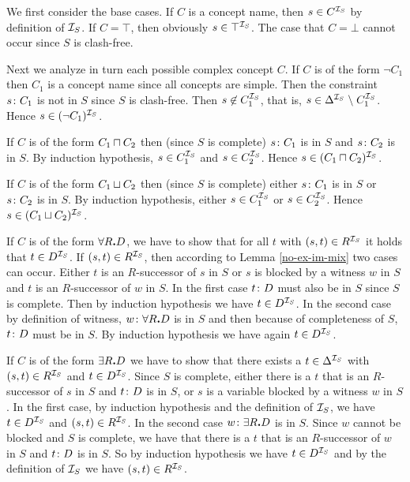 We first consider the base cases.
If $C$ is a concept name, then $s \in C^{{\cal I}_S}$ by definition
of ${{\cal I}_S}$. If $C=\top$, then obviously $s \in \top^{{\cal I}_S}$.
The case that $C=\bot$ cannot occur since $S$ is clash-free.

Next we analyze in turn each possible complex concept $C$.
%
If $C$ is of the form $\neg C_1$ then $C_1$ is a concept name since all
concepts are simple.
Then the constraint $s\colon C_1$ is not in $S$ since $S$ is clash-free.
Then $s \not\in C_1^{{\cal I}_S}$, that is, $s \in \Delta^{{\cal I}_S} \;\backslash\; C_1^{{\cal I}_S}$.
Hence $s \in (\neg C_1)^{{\cal I}_S}$.

If $C$ is of the form $C_1 \sqcap C_2$ then (since $S$ is complete) $s\colon C_1$
is in $S$ and $s\colon C_2$ is in $S$.
By induction hypothesis, $s \in C_1^{{\cal I}_S}$ and $s \in C^{{\cal I}_S}_2$.
Hence $s \in (C_1 \sqcap C_2)^{{\cal I}_S}$.

If $C$ is of the form $C_1 \sqcup C_2$ then (since $S$ is complete)
either $s\colon C_1$
is in $S$ or $s\colon C_2$ is in $S$.
By induction hypothesis, either $s \in C_1^{{\cal I}_S}$ or $s \in C^{{\cal I}_S}_2$.
Hence $s \in (C_1 \sqcup C_2)^{{\cal I}_S}$.

If $C$ is of the form $\forall R \mbox{\bf .} D$, we have to show that for all $t$ with 
$(s,t) \in R^{{\cal I}_S}$ it holds that $t \in D^{{\cal I}_S}$.
If $(s,t) \in R^{{\cal I}_S}$, then according to Lemma \ref{no-ex-im-mix}
two cases can occur.
Either $t$ is an $R$-successor of $s$ in $S$ or $s$ is blocked by a witness $w$
in $S$ and $t$ is an $R$-successor of $w$ in $S$. 
In the first case $t\colon D$ must also be in $S$ since $S$ is complete.
Then by induction hypothesis we have $t \in D^{{\cal I}_S}$.
In the second case by definition of witness, $w\colon\forall R \mbox{\bf .} D$ is in $S$
and then because of completeness of $S$, $t\colon D$ must
be in $S$. By induction hypothesis we have again $t \in D^{{\cal I}_S}$.

If $C$ is of the form $\exists R \mbox{\bf .} D$ we have to show that there exists
a $t \in \Delta^{{\cal I}_S}$ with $(s,t) \in R^{{\cal I}_S}$ and $t \in D^{{\cal I}_S}$.
Since $S$ is complete, either there is a $t$ that is an $R$-successor
of $s$ in $S$ and $t\colon D$ is in $S$, or
$s$ is a variable blocked by a witness $w$ in $S$.
In the first case, by induction hypothesis and the definition of ${{\cal I}_S}$,
we have $t \in D^{{\cal I}_S}$ and $(s,t) \in R^{{\cal I}_S}$.
In the second case $w\colon\exists R \mbox{\bf .} D$ is in $S$.
Since $w$ cannot be blocked and $S$ is complete,
we have that there is a $t$ that is an $R$-successor of $w$ in $S$ and 
$t\colon D$ is in $S$.
So by induction hypothesis we have $t \in D^{{\cal I}_S}$ and by the
definition of ${{\cal I}_S}$ we have $(s,t) \in R^{{\cal I}_S}$.

